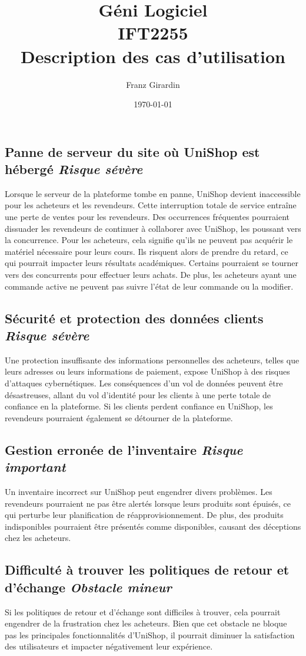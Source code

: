 \documentclass[16pt]{report}
\title{\Huge{Géni Logiciel}\\{IFT2255}\\{\textbf{Description des cas d'utilisation}}}
\author{\huge{Franz Girardin}}
\date{\today}
\begin{document}
\fontsize{12}{12}\selectfont
\subsection*{Panne de serveur du site où UniShop est hébergé \textcolor{myb}{\textit{Risque sévère}}}
Lorsque le serveur de la plateforme tombe en panne, UniShop devient inaccessible pour les acheteurs et les revendeurs. 
Cette interruption totale de service entraîne une perte de ventes pour les revendeurs. Des occurrences fréquentes 
pourraient dissuader les revendeurs de continuer à collaborer avec UniShop, les poussant vers la concurrence. 
Pour les acheteurs, cela signifie qu'ils ne peuvent pas acquérir le matériel nécessaire pour leurs cours. 
Ils risquent alors de prendre du retard, ce qui pourrait impacter leurs résultats académiques. Certains pourraient 
se tourner vers des concurrents pour effectuer leurs achats. De plus, les acheteurs ayant une commande active 
ne peuvent pas suivre l'état de leur commande ou la modifier.

\subsection*{Sécurité et protection des données clients \textcolor{myb}{\textit{Risque sévère}}}
Une protection insuffisante des informations personnelles des acheteurs, telles que leurs adresses ou leurs 
informations de paiement, expose UniShop à des risques d'attaques cybernétiques. Les conséquences d'un vol de données 
peuvent être désastreuses, allant du vol d'identité pour les clients à une perte totale de confiance en la plateforme. 
Si les clients perdent confiance en UniShop, les revendeurs pourraient également se détourner de la plateforme.

\subsection*{Gestion erronée de l'inventaire \textcolor{myb}{\textit{Risque important}}}
Un inventaire incorrect sur UniShop peut engendrer divers problèmes. Les revendeurs pourraient ne pas être alertés 
lorsque leurs produits sont épuisés, ce qui perturbe leur planification de réapprovisionnement. De plus, des produits 
indisponibles pourraient être présentés comme disponibles, causant des déceptions chez les acheteurs.

\subsection*{Difficulté à trouver les politiques de retour et d'échange \textcolor{myb}{\textit{Obstacle mineur}}}
Si les politiques de retour et d'échange sont difficiles à trouver, cela pourrait engendrer de la frustration chez 
les acheteurs. Bien que cet obstacle ne bloque pas les principales fonctionnalités d'UniShop, il pourrait diminuer la 
satisfaction des utilisateurs et impacter négativement leur expérience.
\end{document}
